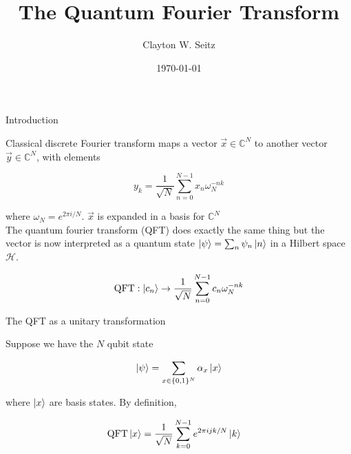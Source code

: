 \documentclass[aspectratio=1610]{beamer}					%
\title{The Quantum Fourier Transform}	%
\author{Clayton W. Seitz}								%
\date{\today}									%
\begin{document}
\begin{frame}
  \titlepage
\end{frame}

\begin{frame}{Introduction}

Classical discrete Fourier transform maps a vector $\vec{x}\in \mathbb{C}^{N}$ to another vector $\vec{y}\in\mathbb{C}^{N}$, with elements

\begin{equation*}
y_{k} = \frac{1}{\sqrt{N}}\sum_{n=0}^{N-1}x_{n}\omega_{N}^{-nk}
\end{equation*}

where $\omega_{N} = e^{2\pi i/N}$. $\vec{x}$ is expanded in a basis for $\mathbb{C}^{N}$\\
\vspace{0.1in}
The quantum fourier transform (QFT) does exactly the same thing but the vector is now interpreted as a quantum state $\ket{\psi}=\sum_{n}\psi_{n}\ket{n}$ in a Hilbert space $\mathcal{H}$. 

\begin{equation*}
\mathrm{QFT}: \ket{c_{n}} \rightarrow \frac{1}{\sqrt{N}}\sum_{n=0}^{N-1}c_{n}\omega_{N}^{-nk}
\end{equation*}


\end{frame}

\begin{frame}{The QFT as a unitary transformation}

Suppose we have the $N$ qubit state 

\begin{equation*}
\ket{\psi} = \sum_{x\in\{0,1\}^{N}}\alpha_{x}\ket{x}
\end{equation*}

where $\ket{x}$ are basis states. By definition, 

\begin{align*}
\mathrm{QFT}\ket{x} &= \frac{1}{\sqrt{N}}\sum_{k=0}^{N-1}e^{2\pi ijk/N}\ket{k}
\end{align*}

\end{frame}

\begin{frame}

\end{frame}
\end{document}
